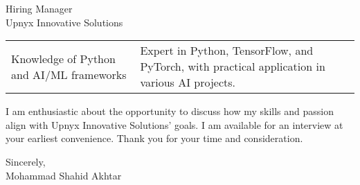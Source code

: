 \documentclass[10.5pt]{letter}
\begin{document}
\begin{letter}{Hiring Manager\\
Upnyx Innovative Solutions}
\begin{tabularx}{\textwidth}{@{}p{}X@{}}
Knowledge of Python and AI/ML frameworks & Expert in Python, TensorFlow, and PyTorch, with practical application in various AI projects. \\

\end{tabularx}

\vspace{0.4cm}
I am enthusiastic about the opportunity to discuss how my skills and passion align with Upnyx Innovative Solutions' goals.  I am available for an interview at your earliest convenience. Thank you for your time and consideration.

\vspace{0.4cm}
\begin{flushleft}
Sincerely,\\
[1.5ex]
Mohammad Shahid Akhtar
\end{flushleft}

\end{letter}
\end{document}

